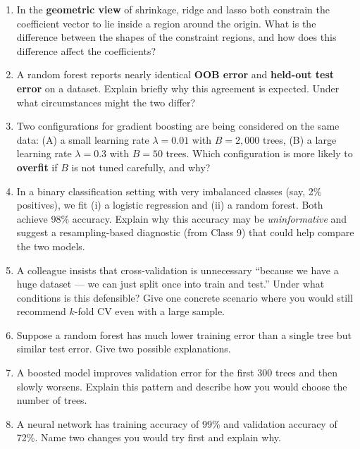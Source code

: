 \documentclass[11pt]{article}
\begin{document}
\begin{enumerate}[leftmargin=*, resume]

\item In the \textbf{geometric view} of shrinkage, ridge and lasso both constrain the coefficient vector to lie inside a region around the origin. What is the difference between the shapes of the constraint regions, and how does this difference affect the coefficients?

\item A random forest reports nearly identical \textbf{OOB error} and \textbf{held-out test error} on a dataset. Explain briefly why this agreement is expected. Under what circumstances might the two differ?

\item Two configurations for gradient boosting are being considered on the same data: (A) a small learning rate $\lambda = 0.01$ with $B = 2{,}000$ trees, (B) a large learning rate $\lambda = 0.3$ with $B = 50$ trees. Which configuration is more likely to \textbf{overfit} if $B$ is not tuned carefully, and why?

\item In a binary classification setting with very imbalanced classes (say, 2\% positives), we fit (i) a logistic regression and (ii) a random forest. Both achieve 98\% accuracy. Explain why this accuracy may be \emph{uninformative} and suggest a resampling-based diagnostic (from Class 9) that could help compare the two models.

\item A colleague insists that cross-validation is unnecessary ``because we have a huge dataset --- we can just split once into train and test.'' Under what conditions is this defensible? Give one concrete scenario where you would still recommend $k$-fold CV even with a large sample.

\item Suppose a random forest has much lower training error than a single tree but similar test error. Give two possible explanations.

\item A boosted model improves validation error for the first 300 trees and then slowly worsens. Explain this pattern and describe how you would choose the number of trees.

\item A neural network has training accuracy of 99\% and validation accuracy of 72\%. Name two changes you would try first and explain why.


\end{enumerate}
\end{document}
